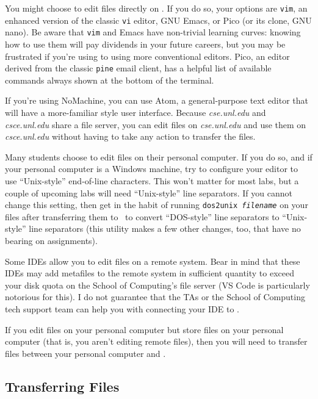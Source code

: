 You might choose to edit files directly on \runtimeenvironment.
If you do so, your options are \texttt{vim}, an enhanced version of the classic \texttt{vi} editor, GNU Emacs, or Pico (or its clone, GNU nano).
Be aware that \texttt{vim} and Emacs have non-trivial learning curves: knowing how to use them will pay dividends in your future careers, but you may be frustrated if you're using to using more conventional editors.
Pico, an editor derived from the classic \texttt{pine} email client, has a helpful list of available commands always shown at the bottom of the terminal.

If you're using NoMachine, you can use Atom, a general-purpose text editor that will have a more-familiar style user interface.
Because \textit{cse.unl.edu} and \textit{csce.unl.edu} share a file server, you can edit files on \textit{cse.unl.edu} and use them on \textit{csce.unl.edu} without having to take any action to transfer the files.

Many students choose to edit files on their personal computer.
If you do so, and if your personal computer is a Windows machine, try to configure your editor to use ``Unix-style'' end-of-line characters.
This won't matter for most labs, but a couple of upcoming labs will need ``Unix-style'' line separators.
If you cannot change this setting, then get in the habit of running \texttt{dos2unix \textit{filename}} on your files after transferring them to \runtimeenvironment\ to convert ``DOS-style'' line separators to ``Unix-style'' line separators (this utility makes a few other changes, too, that have no bearing on \coursenumber assignments).

Some IDEs allow you to edit files on a remote system.
Bear in mind that these IDEs may add metafiles to the remote system in sufficient quantity to exceed your disk quota on the School of Computing's file server (VS Code is particularly notorious for this).
I do not guarantee that the TAs or the School of Computing tech support team can help you with connecting your IDE to \runtimeenvironment.

If you edit files on your personal computer but store files on your personal computer (that is, you aren't editing remote files), then you will need to transfer files between your personal computer and \runtimeenvironment.

\subsection{Transferring Files}

